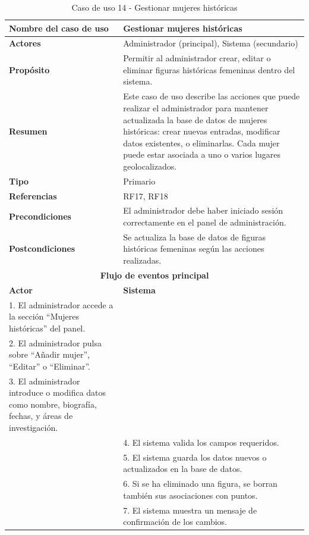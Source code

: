 \begin{table}[H]
\centering
\caption{Caso de uso 14 - Gestionar mujeres históricas}
\begin{tabular}{|p{4.5cm}|p{10.5cm}|}
\hline
\textbf{Nombre del caso de uso} & Gestionar mujeres históricas \\
\hline
\textbf{Actores} & Administrador (principal), Sistema (secundario) \\
\hline
\textbf{Propósito} & Permitir al administrador crear, editar o eliminar figuras históricas femeninas dentro del sistema. \\
\hline
\textbf{Resumen} & Este caso de uso describe las acciones que puede realizar el administrador para mantener actualizada la base de datos de mujeres históricas: crear nuevas entradas, modificar datos existentes, o eliminarlas. Cada mujer puede estar asociada a uno o varios lugares geolocalizados. \\
\hline
\textbf{Tipo} & Primario \\
\hline
\textbf{Referencias} & RF17, RF18 \\
\hline
\textbf{Precondiciones} & El administrador debe haber iniciado sesión correctamente en el panel de administración. \\
\hline
\textbf{Postcondiciones} & Se actualiza la base de datos de figuras históricas femeninas según las acciones realizadas. \\
\hline
\multicolumn{2}{|c|}{\textbf{Flujo de eventos principal}} \\
\hline
\textbf{Actor} & \textbf{Sistema} \\
\hline
1. El administrador accede a la sección “Mujeres históricas” del panel. & \\
\hline
2. El administrador pulsa sobre “Añadir mujer”, “Editar” o “Eliminar”. & \\
\hline
3. El administrador introduce o modifica datos como nombre, biografía, fechas, y áreas de investigación. & \\
\hline
& 4. El sistema valida los campos requeridos. \\
\hline
& 5. El sistema guarda los datos nuevos o actualizados en la base de datos. \\
\hline
& 6. Si se ha eliminado una figura, se borran también sus asociaciones con puntos. \\
\hline
& 7. El sistema muestra un mensaje de confirmación de los cambios. \\
\hline
\end{tabular}
\end{table}

